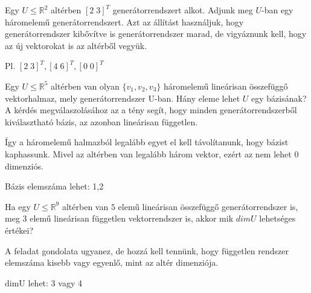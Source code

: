 \begin{frame}
  \begin{tcolorbox}[title={3/6. {\symknight}}]
        Egy $U \leq \mathbb{R}^2$ altérben $[2 \; 3]^T$ generátorrendszert alkot. Adjunk meg $U$-ban egy háromelemű generátorrendszert.
  \tcblower
    Azt az állítást használjuk, hogy generátorrendszer kibővítve is generátorrendszer marad, de vigyáznunk kell, hogy az új vektorokat is az altérből vegyük. \\
    \mmedskip 
  
     Pl. $[2  \; 3]^T, [4 \; 6]^T, [0 \; 0]^T$
  \end{tcolorbox}
\end{frame}


\begin{frame}
  \begin{tcolorbox}[title={3/7. {\symrook}}]
    Egy $U \leq \mathbb{R}^5$ altérben van olyan $\{v_1,v_2,v_3\}$ háromelemű lineárisan összefüggő vektorhalmaz, mely generátorrendszer U-ban. Hány eleme lehet $U$ egy bázisának?
  \tcblower
    A kérdés megválaszolásához az a tény segít, hogy minden generátorrendszerből kiválasztható bázis, az azonban lineárisan független.\\
    \mmedskip
    
    Így a háromelemű halmazból legalább egyet el kell távolítanunk, hogy bázist kaphassunk. Mivel az altérben van legalább három vektor, ezért az nem lehet 0 dimenziós.\\
    \mmedskip 
  
     Bázis elemszáma lehet: 1,2
  \end{tcolorbox}
\end{frame}


\begin{frame}
  \begin{tcolorbox}[title={3/8. {\symrook}}]
    Ha egy $U \leq \mathbb{R}^9$ altérben van $5$ elemű lineárisan összefüggő generátorrendszer is, meg $3$ elemű lineárisan független vektorrendszer is, akkor mik $dimU$ lehetséges értékei?

  \tcblower
    A feladat gondolata ugyanez, de hozzá kell tennünk, hogy független rendszer elemszáma kisebb vagy egyenlő, mint az altér dimenziója.\\
    \mmedskip 
  
     dimU lehet: 3 vagy 4
  \end{tcolorbox}
\end{frame}


